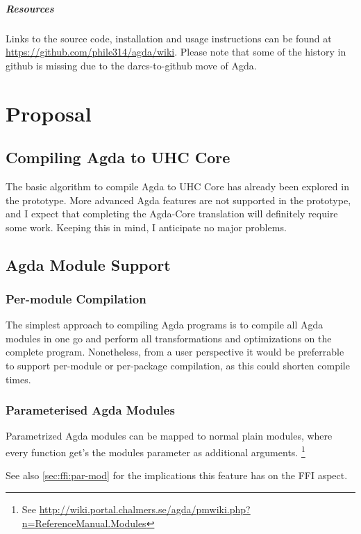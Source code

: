 \documentclass[12pt, a4paper, twoside]{report}
\begin{document}
\paragraph{Resources}
Links to the source code, installation and usage instructions can be found
at \url{https://github.com/phile314/agda/wiki}. Please note that some of the
history in github is missing due to the darcs-to-github move of Agda.

\chapter{Proposal}
\label{chp:proposal}



\section{Compiling Agda to UHC Core}
The basic algorithm to compile Agda to UHC Core has already been explored in the prototype. More
advanced Agda features are not supported in the prototype, and I expect that completing the
Agda-Core translation will definitely require some work. Keeping this in mind,
I anticipate no major problems.

\section{Agda Module Support}
\subsection{Per-module Compilation}
The simplest approach to compiling Agda programs is to compile all Agda modules in one go
and perform all transformations and optimizations on the complete program. Nonetheless, from
a user perspective it would be preferrable to support per-module or per-package compilation,
as this could shorten compile times.

\subsection{Parameterised Agda Modules}
Parametrized Agda modules can be mapped to normal plain modules, where every function get's the
modules parameter as additional arguments.
\footnote{See \url{http://wiki.portal.chalmers.se/agda/pmwiki.php?n=ReferenceManual.Modules}}

See also \ref{sec:ffi:par-mod} for the implications this feature has on the FFI aspect.
\end{document}
